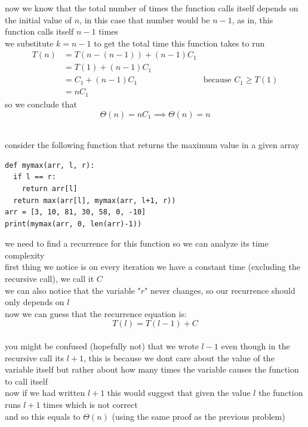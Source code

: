 \documentclass[a4paper,12pt]{article}
\begin{document}
\begin{my_example}
now we know that the total number of times the function calls itself depends on the initial value of \(n\), in this case that number would be \(n - 1\), as in, this function calls itself \(n - 1\) times\\
we substitute \(k = n - 1\) to get the total time this function takes to run\\
\begin{align*}
 T(n) &= T(n-(n-1)) + (n-1)C_1\\
      &= T(1) + (n-1)C_1\\
      &= C_1 + (n-1)C_1 &\text{because } C_1 \geq T(1)\\
      &= nC_1
\end{align*}
so we conclude that\\
\[
  \Theta(n) = nC_1 \implies \Theta(n) = n
\]\\
\end{my_example}

\begin{my_example}
consider the following function that returns the maximum value in a given array\\
\lstset{language=Python,label= ,caption= ,captionpos=b,numbers=none}
\begin{lstlisting}
def mymax(arr, l, r):
  if l == r:
    return arr[l]
  return max(arr[l], mymax(arr, l+1, r))
arr = [3, 10, 81, 30, 58, 0, -10]
print(mymax(arr, 0, len(arr)-1))
\end{lstlisting}

we need to find a recurrence for this function so we can analyze its time complexity\\
first thing we notice is on every iteration we have a constant time (excluding the recursive call), we call it \(C\)\\
we can also notice that the variable "\(r\)" never changes, so our recurrence should only depends on \(l\)\\
now we can guess that the recurrence equation is:\\
\[ T(l) = T(l-1) + C \]\\
you might be confused (hopefully not) that we wrote \(l-1\) even though in the recursive call its \(l+1\), this is because we dont care about the value of the variable itself but rather about how many times the variable causes the function to call itself\\
now if we had written \(l+1\) this would suggest that given the value \(l\) the function runs \(l+1\) times which is not correct\\
and so this equals to \(\Theta(n)\) (using the same proof as the previous problem)\\
\end{my_example}
\end{document}
